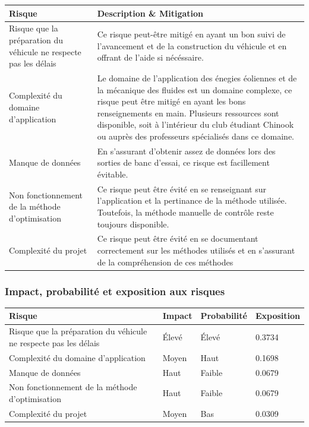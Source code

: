 \begin{table}[H]
  \begin{center}
\begin{tabu} to \linewidth {X[1.5,l]|X[3,l]}
  \textbf{Risque} & \textbf{Description} \& \textbf{Mitigation} \\ \hline
  Risque que la préparation du véhicule ne respecte pas les délais & Ce risque peut-être mitigé en ayant un bon suivi de l'avancement et de la construction du véhicule et en offrant de l'aide si nécéssaire. \\ \hline
  Complexité du domaine d'application & Le domaine de l'application des énegies éoliennes et de la mécanique des fluides est un domaine complexe, ce risque peut être mitigé en ayant les bons renseignements en main. Plusieurs ressources sont disponible, soit à l'intérieur du club étudiant Chinook ou auprès des professeurs spécialisés dans ce domaine.\\ \hline
  Manque de données & En s'assurant d'obtenir assez de données lors des sorties de banc d'essai, ce risque est facillement évitable.\\ \hline
  Non fonctionnement de la méthode d'optimisation & Ce risque peut être évité en se renseignant sur l'application et la pertinance de la méthode utilisée. Toutefois, la méthode manuelle de contrôle reste toujours disponible.\\ \hline
  Complexité du projet & Ce risque peut être évité en se documentant correctement sur les méthodes utilisés et en s'assurant de la compréhension de ces méthodes \\
\end{tabu}
  \end{center}
\end{table}

\subsubsection{Impact, probabilité et exposition aux risques}
\begin{table}[H]
  \begin{center}
    \begin{tabu} to \linewidth {X[3.5,l]|X[0.7,l]|X[1,l]|X[1,l]}
      \textbf{Risque}          & \textbf{Impact} & \textbf{Probabilité} & \textbf{Exposition} \\ \hline
      Risque que la préparation du véhicule ne respecte pas les délais & Élevé & Élevé & 0.3734 \\ \hline
      Complexité du domaine d'application & Moyen & Haut   & 0.1698            \\ \hline
      Manque de données                   & Haut  & Faible & 0.0679            \\ \hline
      Non fonctionnement de la méthode d'optimisation & Haut & Faible & 0.0679 \\ \hline
      Complexité du projet                & Moyen & Bas    & 0.0309            \\
    \end{tabu}
  \end{center}
\end{table}



